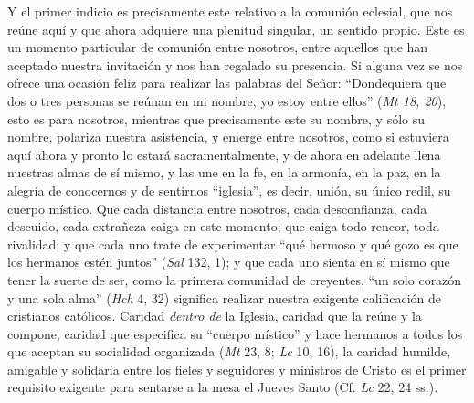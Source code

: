 			\begin{body}Y el primer indicio es precisamente este relativo a la comunión eclesial, que nos reúne aquí y que ahora adquiere una plenitud singular, un sentido propio. Este es un momento particular de comunión entre nosotros, entre aquellos que han aceptado nuestra invitación y nos han regalado su presencia. Si alguna vez se nos ofrece una ocasión feliz para realizar las palabras del Señor: “Dondequiera que dos o tres personas se reúnan en mi nombre, yo estoy entre ellos” (\textit{Mt 18, 20}), esto es para nosotros, mientras que precisamente este su nombre, y sólo su nombre, polariza nuestra asistencia, y emerge entre nosotros, como si estuviera aquí ahora y pronto lo estará sacramentalmente, y de ahora en adelante llena nuestras almas de sí mismo, y las une en la fe, en la armonía, en la paz, en la alegría de conocernos y de sentirnos “iglesia”, es decir, unión, su único redil, su cuerpo místico. Que cada distancia entre nosotros, cada desconfianza, cada descuido, cada extrañeza caiga en este momento; que caiga todo rencor, toda rivalidad; y que cada uno trate de experimentar “qué hermoso y qué gozo es que los hermanos estén juntos” (\textit{Sal} 132, 1); y que cada uno sienta en sí mismo que tener la suerte de ser, como la primera comunidad de creyentes, “un solo corazón y una sola alma” (\textit{Hch }4, 32) significa realizar nuestra exigente calificación de cristianos católicos. Caridad \textit{dentro de} la Iglesia, caridad que la reúne y la compone, caridad que especifica su “cuerpo místico” y hace hermanos a todos los que aceptan su socialidad organizada (\textit{Mt }23, 8; \textit{Lc} 10, 16), la caridad humilde, amigable y solidaria entre los fieles y seguidores y ministros de Cristo es el primer requisito exigente para sentarse a la mesa el Jueves Santo (Cf. \textit{Lc} 22, 24 ss.). \end{body}
			

